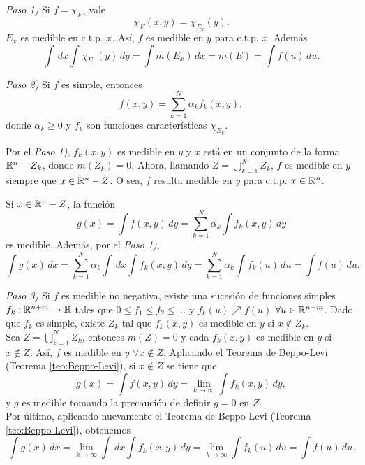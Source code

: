       \begin{demo}
      \emph{Paso 1)}
      Si $f=\chi_E$, vale  \[ \chi_E(x,y)=\chi_{E_x} (y).\]
      $E_x$ es medible en c.t.p. $x$. As\'i, $f$ es medible en $y$ para c.t.p. $x$. Adem\'as
      \[
       \int\,dx \int \chi_{E_x}(y)\,dy =
       \int m(E_x)\,dx =m(E)=\int f(u)\,du.
      \]
      
       \emph{Paso 2)}
       Si $f$ es simple, entonces 
       \[f(x,y)=\sum\limits_{k=1}^N \alpha_k f_k(x,y),\]
       donde $\alpha_k\geq 0$ y $f_k$ son funciones caracter\'isticas 
       $\chi_{E_k}$.
       
       Por el \emph{Paso 1)}, $f_k(x,y)$ es medible en $y$ y $x$ est\'a en un conjunto de la forma $\mathbb{R}^n-Z_k$, donde $m(Z_k)=0$. 
       Ahora, llamando $Z=\bigcup\limits_{k=1}^{N} Z_k$, $f$ es medible en $y$ siempre que $x \in \mathbb{R}^n-Z$. O sea, $f$ resulta medible en $y$ para c.t.p. $x \in \mathbb{R}^n$.

       Si $x \in \mathbb{R}^n-Z$, la funci\'on 
       \[
       g(x)=\int f(x,y)\,dy=\sum\limits_{k=1}^N \alpha_k \int f_k(x,y)\,dy
       \]
        es medible.  Adem\'as, por el \emph{Paso 1)}, 
        \[
        \int g(x)\,dx=
        \sum\limits_{k=1}^N \alpha_k \int\, dx \int f_k(x,y)\,dy
        =
        \sum\limits_{k=1}^N \alpha_k \int f_k(u)\,du=\int f(u)\,du.
        \]
        
        \emph{Paso 3)}
        Si $f$ es medible no negativa, existe una sucesi\'on de funciones simples $f_k:\mathbb{R}^{n+m}\to \mathbb{R}$ tales que $0\leq f_1\leq f_2\leq \ldots$ y $f_k(u)\nearrow f(u)$ $\forall u\in \mathbb{R}^{n+m}$.
        Dado que $f_k$ es simple, existe $Z_k$ tal que $f_k(x,y)$ es medible en $y$  si $x \notin Z_k$. 
        \\
        Sea $Z=\bigcup\limits_{k=1}^N Z_k$, entonces $m(Z)=0$ y cada $f_k(x,y)$ es medible en $y$ si $x \notin Z$. As\'i, $f$ es medible  en $y$ $\forall x \notin Z$. 
        Aplicando el Teorema de Beppo-Levi (Teorema \ref{teo:Beppo-Levi}), si $x \notin Z$  se tiene que
        \[
        g(x)=\int f(x,y)\,dy=\lim\limits_{k\to \infty} \int f_k(x,y)\,dy,
        \]      
        y $g$ es medible tomando la precauci\'on de definir $g=0$ en $Z$.
        \\
        Por \'ultimo, aplicando nuevamente  el Teorema de Beppo-Levi (Teorema \ref{teo:Beppo-Levi}), obtenemos
        \[
        \int g(x)\,dx=\lim\limits_{k \to \infty} \int\,dx \int f_k(x,y)\,dy
        =\lim\limits_{k \to \infty} \int f_k(u)\,du
        =\int f(u)\,du.
        \]
        \end{demo}
        
